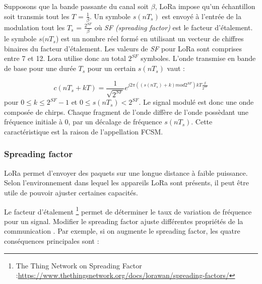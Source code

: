 \vspace{0.1cm}

Supposons que la bande passante du canal soit $\beta$, LoRa impose qu'un échan\-tillon soit transmis tout les $T$ = $\frac{1}{\beta}$. Un symbole $s(nT_s)$ est envoyé à l'entrée de la modulation tout les $T_s$ = $\frac{2^{SF}}{\beta}$ où \textit{SF (spreading factor)} est le facteur d'étalement. le symbole $s(nT_s$) est un nombre réel formé en utilisant un vecteur de chiffres binaires du facteur d'étalement. Les valeurs de \textit{SF} pour LoRa sont comprises entre 7 et 12. Lora utilise donc au total $2^{SF}$ symboles. L'onde transmise en bande de base pour une durée $T_s$ pour un certain $s(nT_s)$ vaut :

\begin{equation}
c(nT_s + kT) = \frac{1}{\sqrt{2^{SF}}} e^{j2\pi ((s(nT_s) +k )mod 2^{SF})kT \frac{\beta}{2^{SF}}}
\end{equation}
pour $0 \leq k \leq 2^{SF}-1$ et $0 \leq s(nT_s) < 2^{SF}$.
Le signal modulé est donc une onde composée de chirps. Chaque fragment de l'onde diffère de l'onde possèdant une fréquence initiale à 0, par un décalage de fréquence $s(nT_s)$. Cette caractéristique est la raison de l'appellation FCSM.


\subsubsection{Spreading factor}

LoRa permet d'envoyer des paquets sur une longue distance à faible puissance. Selon l'environnement dans lequel les appareils LoRa sont présents, il peut être utile de pouvoir ajuster certaines capacités.

\vspace{0.1cm}

Le facteur d'étalement \footnote{The Thing Network on Spreading Factor :\href{https://www.thethingsnetwork.org/docs/lorawan/spreading-factors/}{https://www.thethingsnetwork.org/docs/lorawan/spreading-factors/}} permet de déterminer le taux de variation de fréquence pour un signal. Modifier le spreading factor ajuste différentes propriétés de la communication . Par exemple, si on augmente le spreading factor, les quatre conséquences principales sont :

\vspace{0.1cm}

